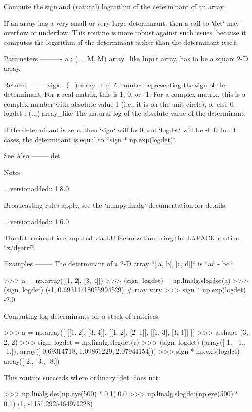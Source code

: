 \begin{DoxyVerb}Compute the sign and (natural) logarithm of the determinant of an array.

If an array has a very small or very large determinant, then a call to
`det` may overflow or underflow. This routine is more robust against such
issues, because it computes the logarithm of the determinant rather than
the determinant itself.

Parameters
----------
a : (..., M, M) array_like
    Input array, has to be a square 2-D array.

Returns
-------
sign : (...) array_like
    A number representing the sign of the determinant. For a real matrix,
    this is 1, 0, or -1. For a complex matrix, this is a complex number
    with absolute value 1 (i.e., it is on the unit circle), or else 0.
logdet : (...) array_like
    The natural log of the absolute value of the determinant.

If the determinant is zero, then `sign` will be 0 and `logdet` will be
-Inf. In all cases, the determinant is equal to ``sign * np.exp(logdet)``.

See Also
--------
det

Notes
-----

.. versionadded:: 1.8.0

Broadcasting rules apply, see the `numpy.linalg` documentation for
details.

.. versionadded:: 1.6.0

The determinant is computed via LU factorization using the LAPACK
routine ``z/dgetrf``.


Examples
--------
The determinant of a 2-D array ``[[a, b], [c, d]]`` is ``ad - bc``:

>>> a = np.array([[1, 2], [3, 4]])
>>> (sign, logdet) = np.linalg.slogdet(a)
>>> (sign, logdet)
(-1, 0.69314718055994529) # may vary
>>> sign * np.exp(logdet)
-2.0

Computing log-determinants for a stack of matrices:

>>> a = np.array([ [[1, 2], [3, 4]], [[1, 2], [2, 1]], [[1, 3], [3, 1]] ])
>>> a.shape
(3, 2, 2)
>>> sign, logdet = np.linalg.slogdet(a)
>>> (sign, logdet)
(array([-1., -1., -1.]), array([ 0.69314718,  1.09861229,  2.07944154]))
>>> sign * np.exp(logdet)
array([-2., -3., -8.])

This routine succeeds where ordinary `det` does not:

>>> np.linalg.det(np.eye(500) * 0.1)
0.0
>>> np.linalg.slogdet(np.eye(500) * 0.1)
(1, -1151.2925464970228)\end{DoxyVerb}
 \mbox{\label{namespacenumpy_1_1linalg_1_1linalg_af431cf925040f156dbcfdc4ac201e9a5}} 
